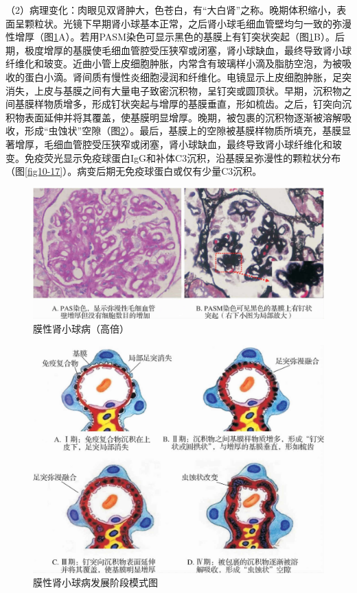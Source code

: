 （2）病理变化：肉眼见双肾肿大，色苍白，有“大白肾”之称。晚期体积缩小，表面呈颗粒状。光镜下早期肾小球基本正常，之后肾小球毛细血管壁均匀一致的弥漫性增厚（图\ref{fig10-15}A）。若用PASM染色可显示黑色的基膜上有钉突状突起（图\ref{fig10-15}B）。后期，极度增厚的基膜使毛细血管腔受压狭窄或闭塞，肾小球缺血，最终导致肾小球纤维化和玻变。近曲小管上皮细胞肿胀，内常含有玻璃样小滴及脂肪空泡，为被吸收的蛋白小滴。肾间质有慢性炎细胞浸润和纤维化。电镜显示上皮细胞肿胀，足突消失，上皮与基膜之间有大量电子致密沉积物，呈钉突或圆顶状。早期，沉积物之间基膜样物质增多，形成钉状突起与增厚的基膜垂直，形如梳齿。之后，钉突向沉积物表面延伸并将其覆盖，使基膜明显增厚。晚期，被包裹的沉积物逐渐被溶解吸收，形成“虫蚀状”空隙（图\ref{fig10-16}）。最后，基膜上的空隙被基膜样物质所填充，基膜显著增厚，毛细血管腔受压狭窄或闭塞，肾小球缺血，最终导致肾小球纤维化和玻变。免疫荧光显示免疫球蛋白IgG和补体C3沉积，沿基膜呈弥漫性的颗粒状分布（图\ref{fig10-17}）。病变后期无免疫球蛋白或仅有少量C3沉积。

\begin{figure}[!htbp]
 \centering
 \includegraphics{./images/Image00163.jpg}
 \captionsetup{justification=centering}
 \caption{膜性肾小球病（高倍）}
 \label{fig10-15}
  \end{figure} 

\begin{figure}[!htbp]
 \centering
 \includegraphics{./images/Image00164.jpg}
 \captionsetup{justification=centering}
 \caption{膜性肾小球病发展阶段模式图}
 \label{fig10-16}
  \end{figure} 

